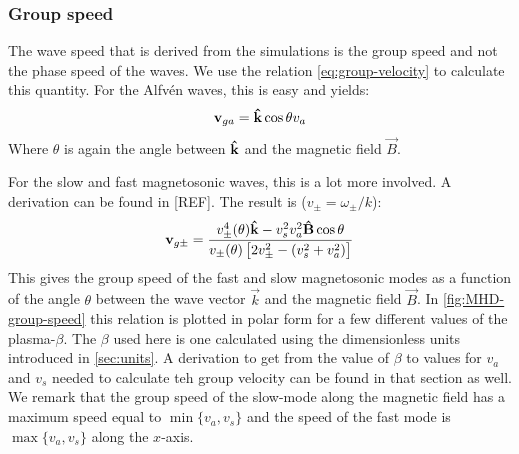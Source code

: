\subsubsection{Group speed}
The wave speed that is derived from the simulations is the group speed and not the phase speed of the waves. We use the relation \cref{eq:group-velocity} to calculate this quantity.
For the Alfvén waves, this is easy and yields:
\begin{equation}
	\mathbf{v}_{ga} = \mathbf{\hat{k}}\cos\theta v_a
\end{equation}
Where $\theta$ is again the angle between $\mathbf{\hat{k}}$ and the magnetic field $\vec{B}$.

For the slow and fast magnetosonic waves, this is a lot more involved. A derivation can be found in  [REF].
The result is ($v_\pm=\omega_\pm/k$):
\begin{equation}
	\mathbf{v}_{g\pm} = \frac{v_\pm^4(\theta)\mathbf{\hat{k}} - v_s^2v_a^2\mathbf{\hat{B}}\cos\theta}{v_\pm(\theta) \left[ 2v_\pm^2-(v_s^2+v_a^2) \right]}
	\label{eq:magnetoaccoustic-group-speed}
\end{equation}
This gives the group speed of the fast and slow magnetosonic modes as a function of the angle $\theta$ between the wave vector $\vec{k}$ and the magnetic field $\vec{B}$.
In \cref{fig:MHD-group-speed} this relation is plotted in polar form for a few different values of the plasma-$\beta$.
The $\beta$ used here is one calculated using the dimensionless units introduced in \cref{sec:units}. 
A derivation to get from the value of $\beta$ to values for $v_a$ and $v_s$ needed to calculate teh group velocity can be found in that section as well.
We remark that the group speed of the slow-mode along the magnetic field has a maximum speed equal to $\min\{v_a,v_s\}$ and the speed of the fast mode is $\max\{v_a,v_s\}$ along the $x$-axis.

